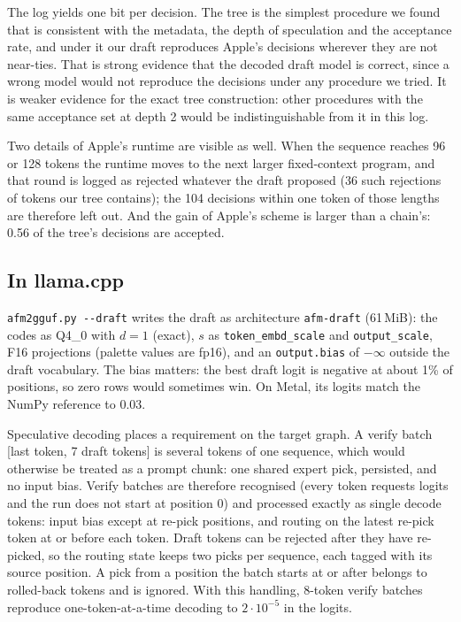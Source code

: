 \documentclass[11pt,reqno]{amsart}
\makeatletter
\newcommand{\code}[1]{\texttt{#1}}
\renewcommand\paragraph{\@startsection{paragraph}{4}\z@{.6\linespacing\@plus.2\linespacing}{-\fontdimen2\font}{\normalfont\bfseries}}
\theoremstyle{definition}
\makeatother
\begin{document}
\paragraph{Limits of the identification.} The log yields one bit per decision. The tree is the simplest procedure we found that is consistent with the metadata, the depth of speculation and the acceptance rate, and under it our draft reproduces Apple's decisions wherever they are not near-ties. That is strong evidence that the decoded draft model is correct, since a wrong model would not reproduce the decisions under any procedure we tried. It is weaker evidence for the exact tree construction: other procedures with the same acceptance set at depth 2 would be indistinguishable from it in this log.

Two details of Apple's runtime are visible as well. When the sequence reaches 96 or 128 tokens the runtime moves to the next larger fixed-context program, and that round is logged as rejected whatever the draft proposed (36 such rejections of tokens our tree contains); the 104 decisions within one token of those lengths are therefore left out. And the gain of Apple's scheme is larger than a chain's: 0.56 of the tree's decisions are accepted.

\subsection{In llama.cpp}
\code{afm2gguf.py -{}-draft} writes the draft as architecture \code{afm-draft} (61\,MiB): the codes as Q4\_0 with $d=1$ (exact), $s$ as \code{token\_embd\_scale} and \code{output\_scale}, F16 projections (palette values are fp16), and an \code{output.bias} of $-\infty$ outside the draft vocabulary. The bias matters: the best draft logit is negative at about 1\% of positions, so zero rows would sometimes win. On Metal, its logits match the NumPy reference to 0.03.

Speculative decoding places a requirement on the target graph. A verify batch [last token, 7 draft tokens] is several tokens of one sequence, which would otherwise be treated as a prompt chunk: one shared expert pick, persisted, and no input bias. Verify batches are therefore recognised (every token requests logits and the run does not start at position 0) and processed exactly as single decode tokens: input bias except at re-pick positions, and routing on the latest re-pick token at or before each token. Draft tokens can be rejected after they have re-picked, so the routing state keeps two picks per sequence, each tagged with its source position. A pick from a position the batch starts at or after belongs to rolled-back tokens and is ignored. With this handling, 8-token verify batches reproduce one-token-at-a-time decoding to $2\cdot10^{-5}$ in the logits.
\end{document}
